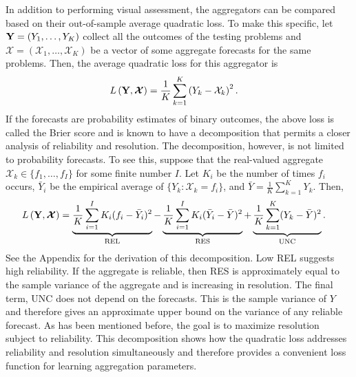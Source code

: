 \documentclass[11pt]{article}
\theoremstyle{definition}
\theoremstyle{definition}
\def\Y{{\bf Y}}
\begin{document}
In addition to performing visual assessment, the aggregators can be compared based on their out-of-sample average quadratic loss. To make this specific, let $\Y = (Y_1, \dots, Y_K)$ collect all the outcomes of the testing problems and $\boldsymbol{\mathcal{X}} = (\mathcal{X}_1, \dots, \mathcal{X}_K)$ be a vector of some aggregate forecasts for the same problems. Then, the average quadratic loss for this aggregator is
\begin{align*}
L\left(\Y, \boldsymbol{\mathcal{X}}\right) &= \frac{1}{K} \sum_{k=1}^K \left(Y_k - \mathcal{X}_k\right)^2.
\end{align*}
If the forecasts are probability estimates of binary outcomes, the above loss is called the Brier score and is known to have a decomposition that permits a closer analysis of  reliability and resolution. The decomposition, however, is not limited to probability forecasts. To see this, suppose that the real-valued aggregate $\mathcal{X}_k \in \{f_1, \dots, f_I\}$ for some finite number $I$. Let $K_i$ be the number of times $f_i$ occurs, $\bar{Y}_i$ be the empirical average of $\{Y_k : \mathcal{X}_k = f_i\}$, and $\bar{Y} = \frac{1}{K} \sum_{k=1}^K Y_k$. Then,
\begin{align}
L\left(\Y, \boldsymbol{\mathcal{X}} \right)  &= \underbrace{\frac{1}{K} \sum_{i=1}^I K_i(f_i - \bar{Y}_i)^2}_\text{REL} - \underbrace{\frac{1}{K} \sum_{i=1}^I K_i(\bar{Y}_i-\bar{Y})^2}_\text{RES} + \underbrace{\frac{1}{K} \sum_{k=1}^K (Y_k - \bar{Y})^2}_\text{UNC}. \label{decomposition}
\end{align}
See the Appendix for the derivation of this decomposition. Low REL suggests high reliability. If the aggregate is reliable, then RES is approximately equal to the sample variance of the aggregate and 
is increasing in resolution.
The final term, UNC does not depend on the forecasts. This is the sample variance of $Y$ and therefore gives an approximate upper bound on the variance of any reliable forecast. As has been mentioned before, the goal is to maximize resolution subject to reliability. This decomposition shows how the quadratic loss addresses reliability and resolution simultaneously and therefore provides a convenient loss function for learning aggregation parameters. 
\end{document}
